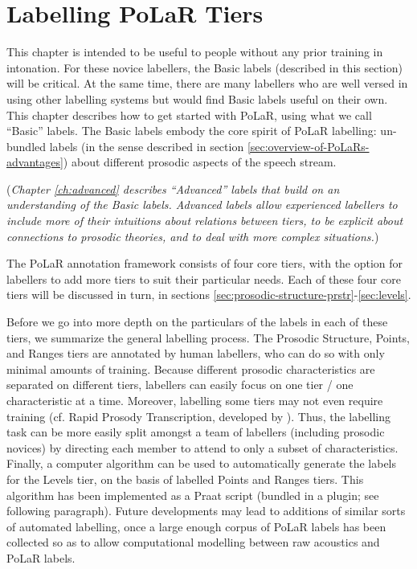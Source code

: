 \documentclass[11pt, twoside]{memoir}
\begin{document}
\section{Labelling PoLaR Tiers}\label{sec:labelling-polar-tiers}

This chapter is intended to be useful to people without any prior training in intonation. For these novice labellers, the Basic labels (described in this section) will be critical. At the same time, there are many labellers who are well versed in using other labelling systems but would find Basic labels useful on their own. This chapter describes how to get started with PoLaR, using what we call “Basic” labels. The Basic labels embody the core spirit of PoLaR labelling: un-bundled labels (in the sense described in section \ref{sec:overview-of-PoLaRs-advantages}) about different prosodic aspects of the speech stream.

(\textit{Chapter \ref{ch:advanced} describes “Advanced” labels that build on an understanding of the Basic labels. Advanced labels allow experienced labellers to include more of their intuitions about relations between tiers, to be explicit about connections to prosodic theories, and to deal with more complex situations.})

The PoLaR annotation framework consists of four core tiers, with the option for labellers to add more tiers to suit their particular needs. Each of these four core tiers will be discussed in turn, in sections \ref{sec:prosodic-structure-prstr}-\ref{sec:levels}.

Before we go into more depth on the particulars of the labels in each of these tiers, we summarize the general labelling process. The Prosodic Structure, Points, and Ranges tiers are annotated by human labellers, who can do so with only minimal amounts of training. Because different prosodic characteristics are separated on different tiers, labellers can easily focus on one tier / one characteristic at a time. Moreover, labelling some tiers may not even require training (cf. Rapid Prosody Transcription, developed by \citealt{cole-14}). Thus, the labelling task can be more easily split amongst a team of labellers (including prosodic novices) by directing each member to attend to only a subset of characteristics. Finally, a computer algorithm can be used to automatically generate the labels for the Levels tier, on the basis of labelled Points and Ranges tiers. This algorithm has been implemented as a Praat script (bundled in a plugin; see following paragraph). Future developments may lead to additions of similar sorts of automated labelling, once a large enough corpus of PoLaR labels has been collected so as to allow computational modelling between raw acoustics and PoLaR labels.
\end{document}
